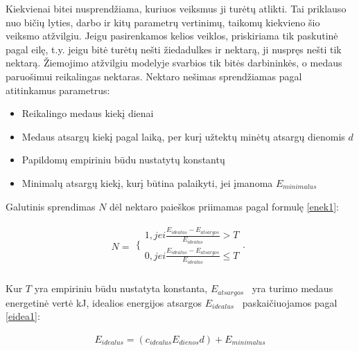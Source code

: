 \documentclass{VUMIFPSmagistrinis}
\begin{document}
Kiekvienai bitei nusprendžiama, kuriuos veiksmus ji turėtų atlikti. Tai priklauso nuo bičių lyties, darbo ir kitų parametrų vertinimų, taikomų kiekvieno šio veiksmo atžvilgiu. Jeigu pasirenkamos kelios veiklos, priskiriama tik paskutinė pagal eilę, t.y. jeigu bitė turėtų nešti žiedadulkes ir nektarą, ji nuspręs nešti tik nektarą. Žiemojimo atžvilgiu modelyje svarbios tik bitės darbininkės, o medaus paruošimui reikalingas nektaras. Nektaro nešimas sprendžiamas pagal atitinkamus parametrus:



\begin{itemize}
\item Reikalingo medaus kiek\k{i} dienai 
\item Medaus atsarg\k{u} kiek\k{i} pagal laik\k{a}, per kur\k{i} u\v{z}tekt\k{u} min\.et\k{u} atsarg\k{u} dienomis  $d$
\item Papildom\k{u} empiriniu b\=udu nustatyt\k{u} konstant\k{u}
\item Minimal\k{u} atsarg\k{u} kiek\k{i}, kur\k{i} b\=utina palaikyti, jei \k{i}manoma  $E_{\mathit{minimalus}}$
\end{itemize}{}

Galutinis sprendimas $N$ dėl nektaro paie\v{s}kos priimamas pagal formul\k{e} \eqref{enek1}:

\begin{equation}
\label{enek1}
N =
\begin{matrix}\{\begin{matrix}1,\mathit{jei}\frac{E_{\mathit{idealus}}-E_{\mathit{atsargos}}}{E_{\mathit{idealus}}}>T\\0,\mathit{jei}\frac{E_{\mathit{idealus}}-E_{\mathit{atsargos}}}{E_{\mathit{idealus}}}{\leq}T\end{matrix}.\\\end{matrix}
\end{equation}

Kur $T$ yra empiriniu būdu nustatyta konstanta,  $E_{\mathit{atsargos}}$ \ yra turimo medaus energetin\.e vert\.e kJ, idealios energijos atsargos  $E_{\mathit{idealus}}$ \ paskai\v{c}iuojamos pagal \eqref{eidea1}:

\begin{equation}
\label{eidea1}
\begin{matrix}E_{\mathit{idealus}}=(c_{\mathit{idealus}}E_{\mathit{dienos}}d)+E_{\mathit{minimalus}}\\\end{matrix}
\end{equation}
\end{document}
